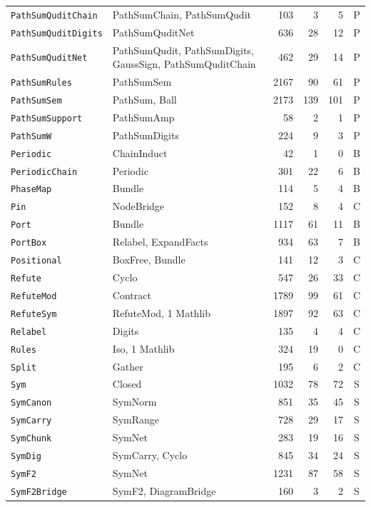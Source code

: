 {\begin{xltabular}{\textwidth}{@{}l>{\raggedright\arraybackslash}Xrrrc@{}}
\texttt{PathSumQuditChain} & PathSumChain, PathSumQudit & 103 & 3 & 5 & P \\
\texttt{PathSumQuditDigits} & PathSumQuditNet & 636 & 28 & 12 & P \\
\texttt{PathSumQuditNet} & PathSumQudit, PathSumDigits, GaussSign, PathSumQuditChain & 462 & 29 & 14 & P \\
\texttt{PathSumRules} & PathSumSem & 2167 & 90 & 61 & P \\
\texttt{PathSumSem} & PathSum, Ball & 2173 & 139 & 101 & P \\
\texttt{PathSumSupport} & PathSumAmp & 58 & 2 & 1 & P \\
\texttt{PathSumW} & PathSumDigits & 224 & 9 & 3 & P \\
\texttt{Periodic} & ChainInduct & 42 & 1 & 0 & B \\
\texttt{PeriodicChain} & Periodic & 301 & 22 & 6 & B \\
\texttt{PhaseMap} & Bundle & 114 & 5 & 4 & B \\
\texttt{Pin} & NodeBridge & 152 & 8 & 4 & C \\
\texttt{Port} & Bundle & 1117 & 61 & 11 & B \\
\texttt{PortBox} & Relabel, ExpandFacts & 934 & 63 & 7 & B \\
\texttt{Positional} & BoxFree, Bundle & 141 & 12 & 3 & C \\
\texttt{Refute} & Cyclo & 547 & 26 & 33 & C \\
\texttt{RefuteMod} & Contract & 1789 & 99 & 61 & C \\
\texttt{RefuteSym} & RefuteMod, 1 Mathlib & 1897 & 92 & 63 & C \\
\texttt{Relabel} & Digits & 135 & 4 & 4 & C \\
\texttt{Rules} & Iso, 1 Mathlib & 324 & 19 & 0 & C \\
\texttt{Split} & Gather & 195 & 6 & 2 & C \\
\texttt{Sym} & Closed & 1032 & 78 & 72 & S \\
\texttt{SymCanon} & SymNorm & 851 & 35 & 45 & S \\
\texttt{SymCarry} & SymRange & 728 & 29 & 17 & S \\
\texttt{SymChunk} & SymNet & 283 & 19 & 16 & S \\
\texttt{SymDig} & SymCarry, Cyclo & 845 & 34 & 24 & S \\
\texttt{SymF2} & SymNet & 1231 & 87 & 58 & S \\
\texttt{SymF2Bridge} & SymF2, DiagramBridge & 160 & 3 & 2 & S \\

\end{xltabular}}
